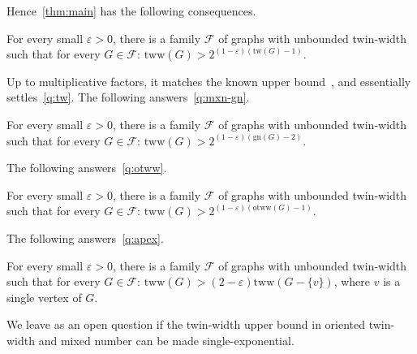 \documentclass[a4paper,UKenglish,cleveref,hyperref,autoref]{lipics-v2021}
\newcommand{\tww}{\text{tww}}
\newcommand{\otww}{\text{otww}}
\newcommand{\tw}{\text{tw}}
\newcommand{\gn}{\text{gn}}
\begin{document}
Hence~\cref{thm:main} has the following consequences.

\begin{corollary}\label{cor:tw}
  For every small $\varepsilon >0$, there is a family $\mathcal F$ of graphs with unbounded twin-width such that for every $G \in \mathcal F$:
  $\tww(G) > 2^{(1-\varepsilon)(\tw(G) - 1)}$.
\end{corollary}
Up to multiplicative factors, it matches the known upper bound~\cite{Jacob22,twin-width1}, and essentially settles~\cref{q:tw}.
The following answers~\cref{q:mxn-gn}.

\begin{corollary}\label{cor:gn}
  For every small $\varepsilon >0$, there is a family $\mathcal F$ of graphs with unbounded twin-width such that for every $G \in \mathcal F$:
  $\tww(G) > 2^{(1-\varepsilon)(\gn(G) - 2)}$.
\end{corollary}

 The following answers~\cref{q:otww}.
\begin{corollary}\label{cor:otww}
  For every small $\varepsilon >0$, there is a family $\mathcal F$ of graphs with unbounded twin-width such that for every $G \in \mathcal F$:
  $\tww(G) > 2^{(1-\varepsilon)(\otww(G) - 1)}$.
\end{corollary}

The following answers~\cref{q:apex}.
\begin{corollary}\label{cor:apex}
  For every small $\varepsilon >0$, there is a family $\mathcal F$ of graphs with unbounded twin-width such that for every $G \in \mathcal F$:
  $\tww(G) > (2-\varepsilon)\tww(G-\{v\})$, where $v$ is a single vertex of $G$.
\end{corollary}

We leave as an open question if the twin-width upper bound in oriented twin-width and mixed number can be made single-exponential.
 

\end{document}
